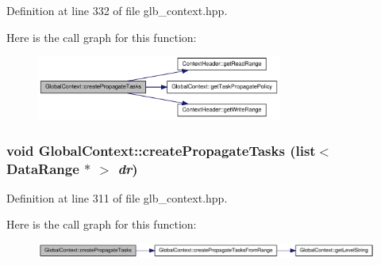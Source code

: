 Definition at line 332 of file glb\_\-context.hpp.

Here is the call graph for this function:\nopagebreak
\begin{figure}[H]
\begin{center}
\leavevmode
\includegraphics[width=228pt]{class_global_context_ad56737fc110208d85069ac902b4cb97b_cgraph}
\end{center}
\end{figure}
\hypertarget{class_global_context_a0f3857165a2d4571d6ae82b86c6becbe}{
\subsubsection[{createPropagateTasks}]{\setlength{\rightskip}{0pt plus 5cm}void GlobalContext::createPropagateTasks (list$<$ {\bf DataRange} $\ast$ $>$ {\em dr})}}
\label{class_global_context_a0f3857165a2d4571d6ae82b86c6becbe}


Definition at line 311 of file glb\_\-context.hpp.

Here is the call graph for this function:\nopagebreak
\begin{figure}[H]
\begin{center}
\leavevmode
\includegraphics[width=341pt]{class_global_context_a0f3857165a2d4571d6ae82b86c6becbe_cgraph}
\end{center}
\end{figure}


